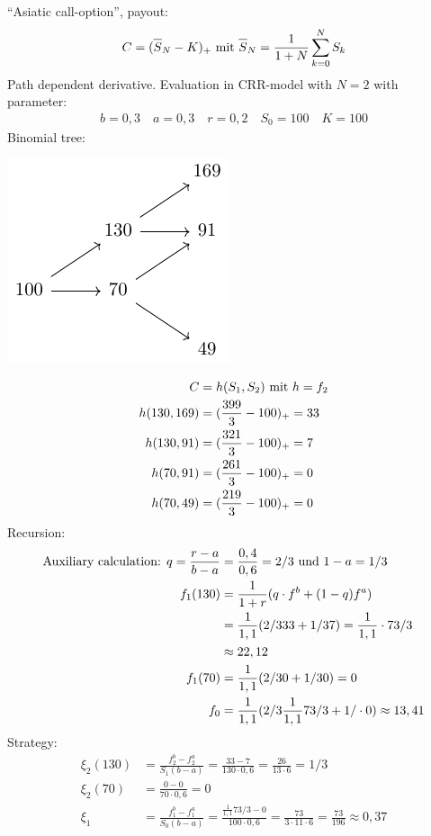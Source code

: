 \begin{*example}
	``Asiatic call-option'', payout:
	\begin{align*}
		C=(\overline{S}_N - K)_+ \mit \overline{S}_N = \frac{1}{1+N}\sum_{k=0}^N S_k
	\end{align*}
	Path dependent derivative. Evaluation in CRR-model with $N=2$ with parameter:
	\begin{align*}
		b=0,3\quad a=0,3 \quad r = 0,2\quad S_0 = 100\quad K = 100
	\end{align*}
	Binomial tree:
\begin{center}
	\includegraphics[width=.5\textwidth]{tikz/stochv_2_3.pdf}
\end{center}
	\begin{align*}
		C&=h(S_1,S_2) \mit h = f_2\\
		h(130,169) &= (\frac{399}{3}-100)_+ = 33\\
		h(130,91) &= (\frac{321}{3}-100)_+ = 7\\
		h(70,91) &= (\frac{261}{3}-100)_+ = 0\\
		h(70,49) &= (\frac{219}{3}-100)_+ = 0
	\end{align*}
	Recursion:\\
	\begin{align*}
		\text{Auxiliary calculation: }q = \frac{r-a}{b-a} &= \frac{0,4}{0,6} = 2/3 \und 1-a = 1/3\\
		f_1(130) &= \frac{1}{1+r}(q \cdot f^b + (1-q)f^a)\\
		&= \frac{1}{1,1}(2/3 33 + 1/3 7) = \frac{1}{1,1}\cdot 73/3\\
		&\approx 22,12\\
		f_1(70) &= \frac{1}{1,1}(2/3 0 + 1/3 0) = 0\\
		f_0 &= \frac{1}{1,1}(2/3 \frac{1}{1,1} 73/3 + 1/\cdot 0) \approx 13,41
	\end{align*}
	Strategy:
	\begin{align*}
		\xi_2(130) &= \frac{f_2^b - f_2^a}{S_1 (b-a)} = \frac{33-7}{130\cdot 0,6} = \frac{26}{13\cdot 6} = 1/3\\
		\xi_2(70) &= \frac{0-0}{70\cdot 0,6} = 0\\
		\xi_1 &= \frac{f_1^b - f_1^a}{S_0(b-a)} = \frac{\frac{1}{1,1}73/3 - 0}{100\cdot 0,6} = \frac{73}{3\cdot 11 \cdot 6} = \frac{73}{196} \approx 0,37 
	\end{align*}
\end{*example}
